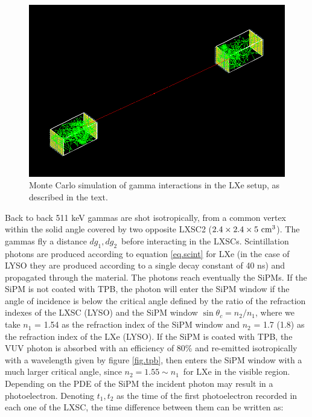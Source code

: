 \documentclass[11pt,a4paper]{article}
\begin{document}
 \begin{figure}[!bthp]
	\centering
	\includegraphics[scale=0.4]{img/PetaloSetup.png}
	\caption{\label{fig.psetup} Monte Carlo simulation of gamma interactions in the LXe setup, as 
	described in the text.}
\end{figure}


%

  Back to back 511 keV gammas are shot isotropically, from a common vertex within the solid angle covered by two opposite LXSC2 ($2.4 \times 2.4 \times 5\ {\rm cm^3}$). The gammas fly a distance $dg_1, dg_2$~before interacting in the LXSCs. Scintillation photons are produced according to equation \ref{eq.scint} for LXe (in the case of LYSO they are produced according to a single decay constant of 40 ns) and propagated through the material. The photons reach eventually the SiPMs. If the SiPM is not coated with TPB, the photon will enter the SiPM window if the angle of incidence is below the critical angle defined by the ratio of the refraction indexes of the LXSC (LYSO) and the SiPM window $\sin \theta_c = n_2/n_1$,  where we take $n_1$ = 1.54 as the refraction index of the SiPM window and
  $n_2$ = 1.7 (1.8) as the refraction index of the LXe (LYSO). If the SiPM is coated with TPB, the 
  VUV photon is absorbed with an efficiency of 80\% and re-emitted isotropically with a wavelength given by figure \ref{fig.tpb}, then enters the SiPM window with a much larger critical angle, since  $n_2 = 1.55 \sim n_1$~for LXe in the visible region. Depending on the PDE of the SiPM the incident photon may result in a photoelectron. Denoting $t_1,t_2$ as the time of the first photoelectron recorded in each one of the LXSC, the time difference between them can be written as:
\end{document}
